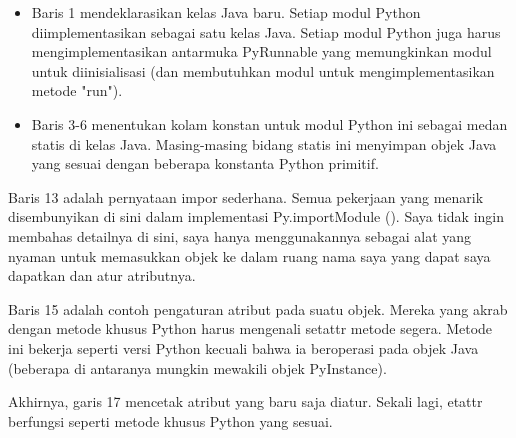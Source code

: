 \documentclass[12pt,a4paper]{article}
\begin{document}
\begin{itemize}
\begin{itemize}

\item Baris 1 mendeklarasikan kelas Java baru. Setiap modul Python diimplementasikan sebagai satu kelas Java. Setiap modul Python juga harus mengimplementasikan antarmuka PyRunnable yang memungkinkan modul untuk diinisialisasi (dan membutuhkan modul untuk mengimplementasikan metode "run"). 
\item Baris 3-6 menentukan kolam konstan untuk modul Python ini sebagai medan statis di kelas Java. Masing-masing bidang statis ini menyimpan objek Java yang sesuai dengan beberapa konstanta Python primitif.

\end{itemize}

\end{itemize}

Baris 13 adalah pernyataan impor sederhana. Semua pekerjaan yang menarik disembunyikan di sini dalam implementasi Py.importModule (). Saya tidak ingin membahas detailnya di sini, saya hanya menggunakannya sebagai alat yang nyaman untuk memasukkan objek ke dalam ruang nama saya yang dapat saya dapatkan dan atur atributnya.

Baris 15 adalah contoh pengaturan atribut pada suatu objek. Mereka yang akrab dengan metode khusus Python harus mengenali setattr metode segera. Metode ini bekerja seperti versi Python kecuali bahwa ia beroperasi pada objek Java (beberapa di antaranya mungkin mewakili objek PyInstance). 

Akhirnya, garis 17 mencetak atribut yang baru saja diatur. Sekali lagi, etattr berfungsi seperti metode khusus Python yang sesuai.
\end{document}
